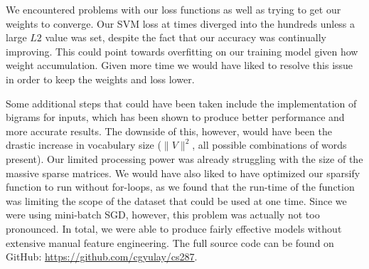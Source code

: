 \documentclass[11pt]{article}
\begin{document}
We encountered problems with our loss functions as well as trying to get our weights to converge. Our SVM loss at times diverged into the hundreds unless a large $L2$ value was set, despite the fact that our accuracy was continually improving. This could point towards overfitting on our training model given how weight accumulation. Given more time we would have liked to resolve this issue in order to keep the weights and loss lower.

Some additional steps that could have been taken include the implementation of bigrams for inputs, which has been shown to produce better performance and more accurate results. The downside of this, however, would have been the drastic increase in vocabulary size ($\|V\|^2$, all possible combinations of words present). Our limited processing power was already struggling with the size of the massive sparse matrices. We would have also liked to have optimized our sparsify function to run without for-loops, as we found that the run-time of the function was limiting the scope of the dataset that could be used at one time. Since we were using mini-batch SGD, however, this problem was actually not too pronounced. In total, we were able to produce fairly effective models without extensive manual feature engineering. The full source code can be found on GitHub: \url{https://github.com/cgyulay/cs287}.



\end{document}
